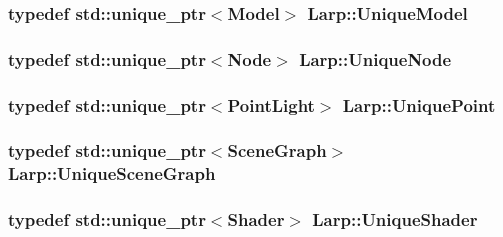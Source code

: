 \subsubsection[{\texorpdfstring{Unique\+Model}{UniqueModel}}]{\setlength{\rightskip}{0pt plus 5cm}typedef std\+::unique\+\_\+ptr$<${\bf Model}$>$ {\bf Larp\+::\+Unique\+Model}}\hypertarget{namespaceLarp_a6e9a93e4118b723d56766c7ae7e1e94a}{}\label{namespaceLarp_a6e9a93e4118b723d56766c7ae7e1e94a}
\subsubsection[{\texorpdfstring{Unique\+Node}{UniqueNode}}]{\setlength{\rightskip}{0pt plus 5cm}typedef std\+::unique\+\_\+ptr$<${\bf Node}$>$ {\bf Larp\+::\+Unique\+Node}}\hypertarget{namespaceLarp_ad95a88bc34f8c78cefd64c9bbeb94a58}{}\label{namespaceLarp_ad95a88bc34f8c78cefd64c9bbeb94a58}
\subsubsection[{\texorpdfstring{Unique\+Point}{UniquePoint}}]{\setlength{\rightskip}{0pt plus 5cm}typedef std\+::unique\+\_\+ptr$<${\bf Point\+Light}$>$ {\bf Larp\+::\+Unique\+Point}}\hypertarget{namespaceLarp_acd7cacff15535544525abc2e90e07b91}{}\label{namespaceLarp_acd7cacff15535544525abc2e90e07b91}
\subsubsection[{\texorpdfstring{Unique\+Scene\+Graph}{UniqueSceneGraph}}]{\setlength{\rightskip}{0pt plus 5cm}typedef std\+::unique\+\_\+ptr$<${\bf Scene\+Graph}$>$ {\bf Larp\+::\+Unique\+Scene\+Graph}}\hypertarget{namespaceLarp_a81a0d129ec1fc8f1f9fa231fbba6b19b}{}\label{namespaceLarp_a81a0d129ec1fc8f1f9fa231fbba6b19b}
\subsubsection[{\texorpdfstring{Unique\+Shader}{UniqueShader}}]{\setlength{\rightskip}{0pt plus 5cm}typedef std\+::unique\+\_\+ptr$<${\bf Shader}$>$ {\bf Larp\+::\+Unique\+Shader}}\hypertarget{namespaceLarp_a0e50ce889dd41e1be4ced22511b7f80a}{}\label{namespaceLarp_a0e50ce889dd41e1be4ced22511b7f80a}
